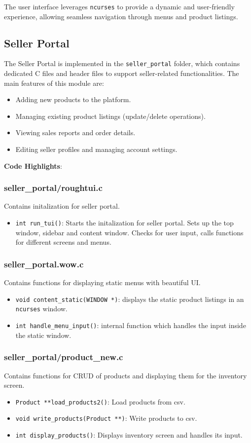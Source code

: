 \documentclass[12pt,a4paper]{article}
\begin{document}
The user interface leverages \texttt{ncurses} to provide a dynamic and user-friendly experience, allowing seamless navigation through menus and product listings.

\subsection{Seller Portal}
The Seller Portal is implemented in the \texttt{seller\_portal} folder, which contains dedicated C files and header files to support seller-related functionalities. The main features of this module are:
\begin{itemize}
    \item Adding new products to the platform.
    \item Managing existing product listings (update/delete operations).
    \item Viewing sales reports and order details.
    \item Editing seller profiles and managing account settings.
\end{itemize}


\textbf{Code Highlights}:
\subsubsection{seller\_portal/roughtui.c}
Contains initalization for seller portal.
\begin{itemize}
    \item \texttt{int run\_tui()}: Starts the initalization for seller portal. Sets up the top window, sidebar and content window. Checks for user input, calls functions for different screens and menus.
\end{itemize}

\subsubsection{seller\_portal.wow.c}
Contains functions for displaying static menus with beautiful UI.
\begin{itemize}
    \item \texttt{void content\_static(WINDOW *)}: displays the static product listings in an \texttt{ncurses} window.
    \item \texttt{int handle\_menu\_input()}: internal function which handles the input inside the static window.
\end{itemize}


\subsubsection{seller\_portal/product\_new.c}
Contains functions for CRUD of products and displaying them for the inventory screen.
\begin{itemize}
    \item \texttt{Product **load\_products2()}: Load products from csv.
    \item \texttt{void write\_products(Product **)}: Write products to csv.
    \item \texttt{int display\_products()}: Displays inventory screen and handles its input.
\end{itemize}
\end{document}
